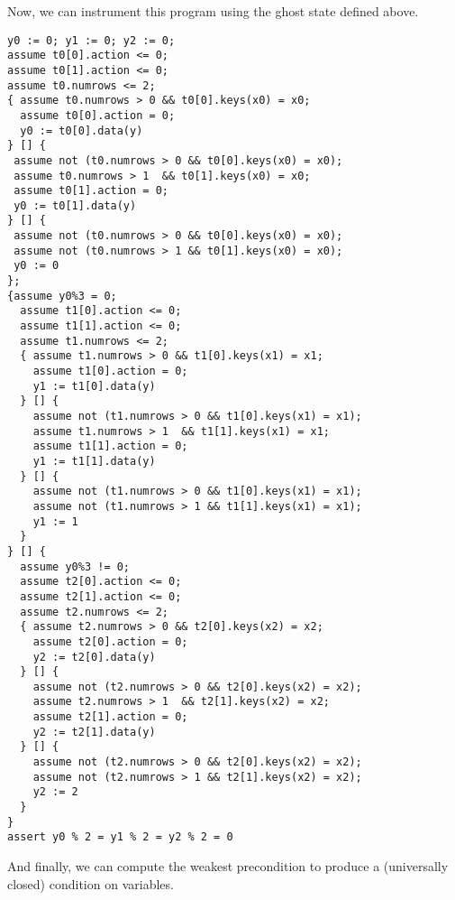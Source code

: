 \documentclass{article}
\begin{document}
Now, we can instrument this program using the ghost state defined above.
\begin{verbatim}
y0 := 0; y1 := 0; y2 := 0;
assume t0[0].action <= 0;
assume t0[1].action <= 0;
assume t0.numrows <= 2;
{ assume t0.numrows > 0 && t0[0].keys(x0) = x0;
  assume t0[0].action = 0;
  y0 := t0[0].data(y)
} [] {
 assume not (t0.numrows > 0 && t0[0].keys(x0) = x0);
 assume t0.numrows > 1  && t0[1].keys(x0) = x0;
 assume t0[1].action = 0;
 y0 := t0[1].data(y)
} [] {
 assume not (t0.numrows > 0 && t0[0].keys(x0) = x0);
 assume not (t0.numrows > 1 && t0[1].keys(x0) = x0);
 y0 := 0
};
{assume y0%3 = 0;
  assume t1[0].action <= 0;
  assume t1[1].action <= 0;
  assume t1.numrows <= 2;
  { assume t1.numrows > 0 && t1[0].keys(x1) = x1;
    assume t1[0].action = 0;
    y1 := t1[0].data(y)
  } [] {
    assume not (t1.numrows > 0 && t1[0].keys(x1) = x1);
    assume t1.numrows > 1  && t1[1].keys(x1) = x1;
    assume t1[1].action = 0;
    y1 := t1[1].data(y)
  } [] {
    assume not (t1.numrows > 0 && t1[0].keys(x1) = x1);
    assume not (t1.numrows > 1 && t1[1].keys(x1) = x1);
    y1 := 1
  }
} [] {
  assume y0%3 != 0;
  assume t2[0].action <= 0;
  assume t2[1].action <= 0;
  assume t2.numrows <= 2;
  { assume t2.numrows > 0 && t2[0].keys(x2) = x2;
    assume t2[0].action = 0;
    y2 := t2[0].data(y)
  } [] {
    assume not (t2.numrows > 0 && t2[0].keys(x2) = x2);
    assume t2.numrows > 1  && t2[1].keys(x2) = x2;
    assume t2[1].action = 0;
    y2 := t2[1].data(y)
  } [] {
    assume not (t2.numrows > 0 && t2[0].keys(x2) = x2);
    assume not (t2.numrows > 1 && t2[1].keys(x2) = x2);
    y2 := 2
  }
}
assert y0 % 2 = y1 % 2 = y2 % 2 = 0
\end{verbatim}

And finally, we can compute the weakest precondition to produce a (universally
closed) condition on variables.
\end{document}
